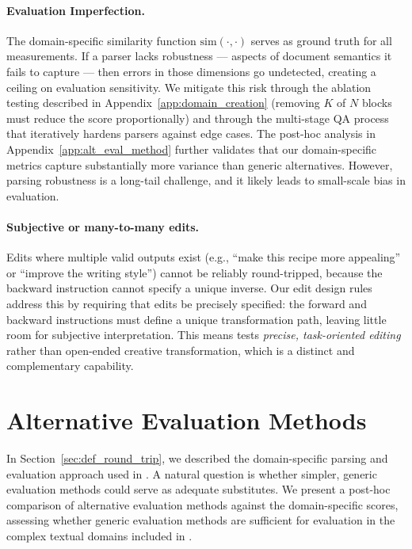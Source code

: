 \documentclass{article} %
\begin{document}
\paragraph{Evaluation Imperfection.} The domain-specific similarity function $\mathrm{sim}(\cdot, \cdot)$ serves as ground truth for all measurements. If a parser lacks robustness --- aspects of document semantics it fails to capture --- then errors in those dimensions go undetected, creating a ceiling on evaluation sensitivity. We mitigate this risk through the ablation testing described in Appendix~\ref{app:domain_creation} (removing $K$ of $N$ blocks must reduce the score proportionally) and through the multi-stage QA process that iteratively hardens parsers against edge cases. The post-hoc analysis in Appendix~\ref{app:alt_eval_method} further validates that our domain-specific metrics capture substantially more variance than generic alternatives. However, parsing robustness is a long-tail challenge, and it likely leads to small-scale bias in evaluation.

\paragraph{Subjective or many-to-many edits.} Edits where multiple valid outputs exist (e.g., ``make this recipe more appealing'' or ``improve the writing style'') cannot be reliably round-tripped, because the backward instruction cannot specify a unique inverse. Our edit design rules address this by requiring that edits be precisely specified: the forward and backward instructions must define a unique transformation path, leaving little room for subjective interpretation. This means \benchmark{} tests \textit{precise, task-oriented editing} rather than open-ended creative transformation, which is a distinct and complementary capability.


\section{Alternative Evaluation Methods} \label{app:alt_eval}

In Section~\ref{sec:def_round_trip}, we described the domain-specific parsing and evaluation approach used in \benchmark{}. A natural question is whether simpler, generic evaluation methods could serve as adequate substitutes. We present a post-hoc comparison of alternative evaluation methods against the domain-specific scores, assessing whether generic evaluation methods are sufficient for evaluation in the complex textual domains included in \benchmark{}.
\end{document}
